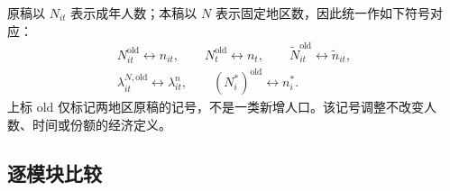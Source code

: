\documentclass[UTF8,a4paper,zihao=-4,fontset=windows]{ctexart}
\numberwithin{equation}{section}
\begin{document}
原稿以 $N_{it}$ 表示成年人数；本稿以 $N$ 表示固定地区数，因此统一作如下符号对应：
\begin{equation}
  \begin{gathered}
  N_{it}^{\mathrm{old}}\longleftrightarrow n_{it},\qquad
  N_t^{\mathrm{old}}\longleftrightarrow n_t,\qquad
  \widetilde N_{it}^{\mathrm{old}}\longleftrightarrow\widetilde n_{it},\\
  \lambda_{it}^{N,\mathrm{old}}\longleftrightarrow\lambda_{it}^{n},\qquad
  (N_i^*)^{\mathrm{old}}\longleftrightarrow n_i^*.
  \end{gathered}
  \label{eq:app-population-notation-mapping}
\end{equation}
上标 $\mathrm{old}$ 仅标记两地区原稿的记号，不是一类新增人口。该记号调整不改变人数、时间或份额的经济定义。

\subsection{逐模块比较}
\small
\end{document}
